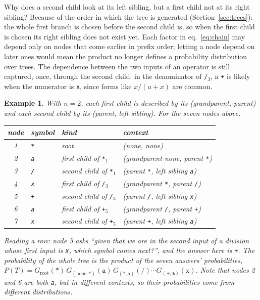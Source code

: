 \documentclass[11pt]{article}
\newtheorem{example}{Example}
\begin{document}
Why does a second child look at its left sibling, but a first child not at its right sibling? Because
of the order in which the tree is generated (Section~\ref{sec:trees}): the whole first branch is
chosen before the second child is, so when the first child is chosen its right sibling does not exist
yet. Each factor in eq.~\eqref{eq:chain} may depend only on nodes that come earlier in prefix order;
letting a node depend on later ones would mean the product no longer defines a probability
distribution over trees. The dependence between the two inputs of an operator is still captured, once,
through the second child: in the denominator of \texttt{/}$_3$, a \texttt{+} is likely when the
numerator is \texttt{x}, since forms like $x/(a+x)$ are common.

\begin{example}\label{ex:contexts}
With $n=2$, each first child is described by its (grandparent, parent) and each second child by its
(parent, left sibling). For the seven nodes above:
\begin{center}
\begin{tabular}{clll}
  \toprule
  node & symbol & kind & context\\
  \midrule
  1 & \texttt{*} & root & (none, none)\\
  2 & \texttt{a} & first child of \texttt{*}$_1$ & (grandparent none, parent \texttt{*})\\
  3 & \texttt{/} & second child of \texttt{*}$_1$ & (parent \texttt{*}, left sibling \texttt{a})\\
  4 & \texttt{x} & first child of \texttt{/}$_3$ & (grandparent \texttt{*}, parent \texttt{/})\\
  5 & \texttt{+} & second child of \texttt{/}$_3$ & (parent \texttt{/}, left sibling \texttt{x})\\
  6 & \texttt{a} & first child of \texttt{+}$_5$ & (grandparent \texttt{/}, parent \texttt{+})\\
  7 & \texttt{x} & second child of \texttt{+}$_5$ & (parent \texttt{+}, left sibling \texttt{a})\\
  \bottomrule
\end{tabular}
\end{center}
Reading a row: node 5 asks ``given that we are in the second input of a division whose first input is
\texttt{x}, which symbol comes next?'', and the answer here is \texttt{+}. The probability of the
whole tree is the product of the seven answers' probabilities,
$P(T) = G_{\text{root}}(\texttt{*})\,G_{(\text{none},\texttt{*})}(\texttt{a})\,G_{(\texttt{*},\texttt{a})}(\texttt{/})
\cdots G_{(\texttt{+},\texttt{a})}(\texttt{x})$.
Note that nodes 2 and 6 are both \texttt{a}, but in different contexts, so their probabilities come
from different distributions.
\end{example}
\end{document}
